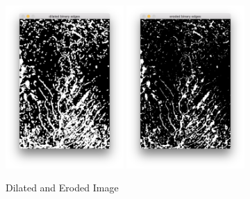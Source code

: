 \begin{figure}[H]
  	\centering
    \includegraphics[width=0.4\textwidth]{images/algorithm/dilated.png}
    \includegraphics[width=0.4\textwidth]{images/algorithm/eroded.png}

  	\caption[Dilated and Eroded Image]{Dilated and Eroded Image}
  	\label{fig:dilate_and_erode}
\end{figure}
